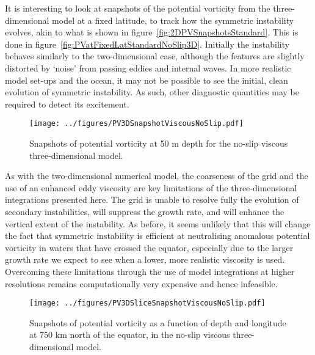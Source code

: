 It is interesting to look at snapshots of the potential vorticity from the three-dimensional model at a fixed latitude, to track how the symmetric instability evolves, akin to what is shown in figure~\ref{fig:2DPVSnapshotsStandard}.
This is done in figure~\ref{fig:PVatFixedLatStandardNoSlip3D}. Initially the instability behaves similarly to the two-dimensional case, although the features are slightly distorted by `noise' from passing eddies and internal waves. In more realistic model set-ups and the ocean, it may not be possible to see the initial, clean evolution of symmetric instability. As such, other diagnostic quantities may be required to detect its excitement.

\begin{figure}[p]
    \centering
    \texttt{[image: ../figures/PV3DSnapshotViscousNoSlip.pdf]}
    \caption{Snapshots of potential vorticity at 50 m depth for the no-slip viscous three-dimensional model.}
    \label{fig:PV3DSnapshotViscousNoSlip}
\end{figure}

As with the two-dimensional numerical model, the coarseness of the grid and the use of an enhanced eddy viscosity are key limitations of the three-dimensional integrations presented here. The grid is unable to resolve fully the evolution of secondary instabilities, will suppress the growth rate, and will enhance the vertical extent of the instability. As before, it seems unlikely that this will change the fact that symmetric instability is efficient at neutralising anomalous potential vorticity in waters that have crossed the equator, especially due to the larger growth rate we expect to see when a lower, more realistic viscosity is used. Overcoming these limitations through the use of model integrations at higher resolutions remains computationally very expensive and hence infeasible. 

\begin{figure}[t]
    \centering
    \texttt{[image: ../figures/PV3DSliceSnapshotViscousNoSlip.pdf]}
    \caption{Snapshots of potential vorticity as a function of depth and longitude at 750 km north of the equator, in the no-slip viscous three-dimensional model.}
    \label{fig:PVatFixedLatForViscous3D}
\end{figure}

